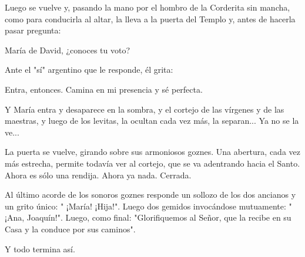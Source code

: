 \documentclass[12pt, twoside, openright]{book} %
\begin{document}
Luego se vuelve y, pasando la mano por el hombro de la Corderita sin mancha, como para conducirla al altar, la lleva a la puerta del Templo y, antes de hacerla pasar pregunta: 

María de David, ¿conoces tu voto? 

Ante el "sí" argentino que le responde, él grita: 

Entra, entonces. Camina en mi presencia y sé perfecta. 

Y María entra y desaparece en la sombra, y el cortejo de las vírgenes y de las maestras, y luego de los levitas, la ocultan cada vez más, la separan... Ya no se la ve... 

La puerta se vuelve, girando sobre sus armoniosos goznes. Una abertura, cada vez más estrecha, permite todavía ver al cortejo, que se va adentrando hacia el Santo. Ahora es sólo una rendija. Ahora ya nada. Cerrada. 

Al último acorde de los sonoros goznes responde un sollozo de los dos ancianos y un grito único: " ¡María! ¡Hija!". Luego dos gemidos invocándose mutuamente: " ¡Ana, Joaquín!". Luego, como final: "Glorifiquemos al Señor, que la recibe en su Casa y la conduce por sus caminos". 

Y todo termina así. 
\end{document}
